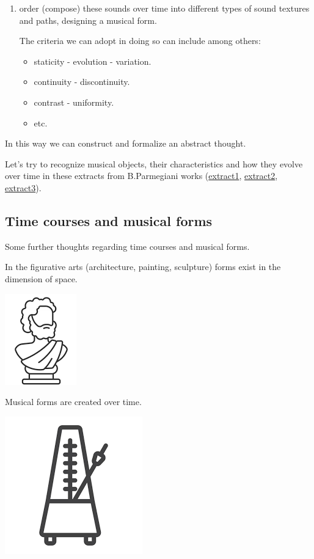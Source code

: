 \begin{enumerate}
\item order (compose) these sounds over time into different types of sound textures and paths, designing a musical form.

  The criteria we can adopt in doing so can include among others:

  \begin{itemize}
  \tightlist
  \item staticity - evolution - variation.
  \item continuity - discontinuity.
  \item contrast - uniformity.
  \item etc.
  \end{itemize}
\end{enumerate}

In this way we can construct and formalize an abstract thought.

Let's try to recognize musical objects, their characteristics and how they evolve over time in these extracts from B.Parmegiani works (\href{http://www.musicaecodice.it/gitmedia/emc/3_media/parme1.mp4}{extract1}, \href{http://www.musicaecodice.it/gitmedia/emc/3_media/parme2.mp3}{extract2}, \href{http://www.musicaecodice.it/gitmedia/emc/3_media/parme3.mp3}{extract3}).

\subsection{Time courses and musical forms}\label{time-courses-and-musical-forms}

Some further thoughts regarding time courses and musical forms.

In the figurative arts (architecture, painting, sculpture) forms exist in the dimension of space.

\begin{center}
\includegraphics[scale=0.4]{../img/scultura.png}
\end{center}

Musical forms are created over time.

\begin{center}
\includegraphics[scale=0.2]{../img/metronomo.png}
\end{center}


